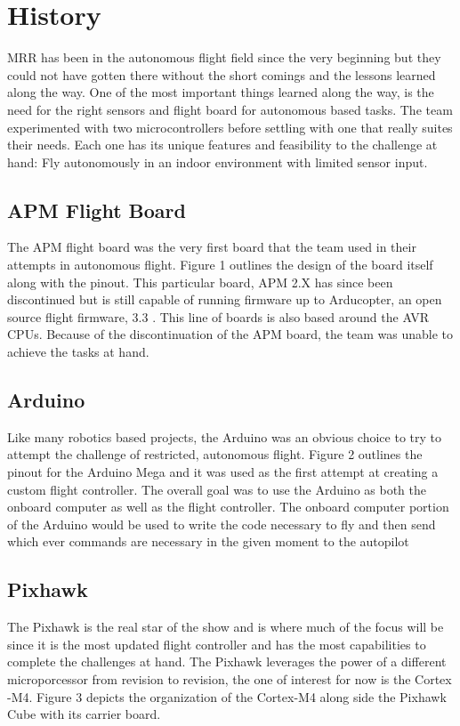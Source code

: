 \documentclass[conference,12pt, ]{IEEEtran}
\begin{document}
\section{History}
MRR has been in the autonomous flight field since the very beginning but they could not have gotten there without the short comings and the lessons learned along the way. One of the most important things learned along the way, is the need for the right sensors and flight board for autonomous based tasks. The team experimented with two microcontrollers before settling with one that really suites their needs. Each one has its unique features and feasibility to the challenge at hand: Fly autonomously in an indoor environment with limited sensor input.

\subsection{APM Flight Board}
The APM flight board was the very first board that the team used in their attempts in autonomous flight. Figure 1 outlines the design of the board itself along with the pinout. This particular board, APM 2.X has since been discontinued but is still capable of running firmware up to Arducopter, an open source flight firmware, 3.3 \cite{apm_board}. This line of boards is also based around the AVR CPUs. Because of the discontinuation of the APM board, the team was unable to achieve the tasks at hand. 

\subsection{Arduino}
Like many robotics based projects, the Arduino was an obvious choice to try to attempt the challenge of restricted, autonomous flight. Figure 2 outlines the pinout for the Arduino Mega and it was used as the first attempt at creating a custom flight controller. The overall goal was to use the Arduino as both the onboard computer as well as the flight controller. The onboard computer portion of the Arduino would be used to write the code necessary to fly and then send which ever commands are necessary in the given moment to the autopilot \cite{on_board}

\subsection{Pixhawk}
The Pixhawk is the real star of the show and is where much of the focus will be since it is the most updated flight controller and has the most capabilities to complete the challenges at hand. The Pixhawk leverages the power of a different microporcessor from revision to revision, the one of interest for now is the Cortex -M4. Figure 3 depicts the organization of the Cortex-M4 along side the Pixhawk Cube with its carrier board.
\end{document}
